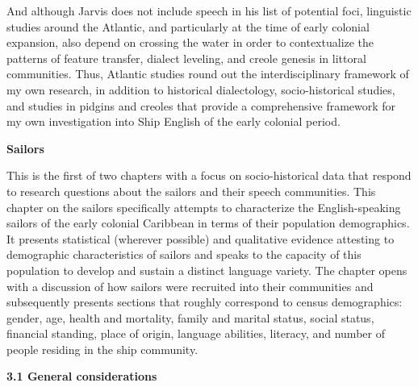 \begin{styleStandard}
And although Jarvis does not include speech in his list of potential foci, linguistic studies around the Atlantic, and particularly at the time of early colonial expansion, also depend on crossing the water in order to contextualize the patterns of feature transfer, dialect leveling, and creole genesis in littoral communities. Thus, Atlantic studies round out the interdisciplinary framework of my own research, in addition to historical dialectology, socio-historical studies, and studies in pidgins and creoles that provide a comprehensive framework for my own investigation into Ship English of the early colonial period. 
\end{styleStandard}


\setcounter{listWWNumxvileveli}{2}
\begin{listWWNumxvileveli}
\item 
\clearpage\begin{styleListParagraph}
\textbf{Sailors}
\end{styleListParagraph}
\end{listWWNumxvileveli}
\begin{styleStandard}
This is the first of two chapters with a focus on socio-historical data that respond to research questions about the sailors and their speech communities. This chapter on the sailors specifically attempts to characterize the English-speaking sailors of the early colonial Caribbean in terms of their population demographics. It presents statistical (wherever possible) and qualitative evidence attesting to demographic characteristics of sailors and speaks to the capacity of this population to develop and sustain a distinct language variety. The chapter opens with a discussion of how sailors were recruited into their communities and subsequently presents sections that roughly correspond to census demographics: gender, age, health and mortality, family and marital status, social status, financial standing, place of origin, language abilities, literacy, and number of people residing in the ship community. 
\end{styleStandard}

\begin{styleStandard}
\textbf{3.1 General considerations}
\end{styleStandard}

